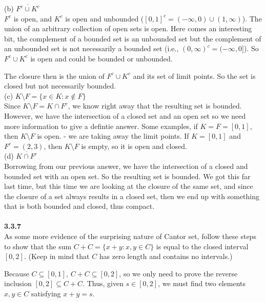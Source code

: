 (b) $\overline{F^c \cup K^c}$
\\

$F^c$ is open, and $K^c$ is open and unbounded ($[0,1]^c = (-\infty,0) \cup (1, \infty)$).
The union of an arbitrary collection of open sets is open.
Here comes an interesting bit, the complement of a bounded set is an unbounded set but the complement of an
unbounded set is not necessarily a bounded set (i.e., $(0,\infty)^c = (-\infty,0]$).
So $F^c \cup K^c$ is open and could be bounded or unbounded.

The closure then is the union of $F^c \cup K^c$ and its set of limit points.
So the set is closed but not necessarily bounded.
\\

(c) $K\setminus F = \{ x \in K : x\not\in F \}$
\\

Since $K \setminus F = K \cap F^c$, we know right away that the resulting set is bounded.
However, we have the intersection of a closed set and an open set so we need more information to give a defintie answer.
Some examples, if $K = F = [0,1]$, then $K \setminus F$ is open. - we are taking away the limit points.
If $K = [0,1]$ and $F^c = (2,3)$, then $K \setminus F$ is empty, so it is open and closed.
\\

(d) $\overline{K \cap F^c}$
\\

Borrowing from our previous answer, we have the intersection of a closed and bounded set with an open set.
So the resulting set is bounded.
We got this far last time, but this time we are looking at the closure of the same set, and since the closure of
a set always results in a closed set, then we end up with something that is both bounded and closed, thus
compact.
\\~\\



\textbf{3.3.7}
\\

As some more evidence of the surprising nature of Cantor set, follow these steps to show that the sum
$C + C = \{ x+y : x,y\in C \}$
is equal to the closed interval $[0,2]$.
(Keep in mind that $C$ has zero length and contains no intervals.)

Because $C \subseteq [0,1]$, $C + C \subseteq [0,2]$, so we only need to prove the reverse inclusion
$[0,2] \subseteq C + C$.
Thus, given $s \in  [0,2]$, we must find two elements $x,y \in C$ satisfying $x + y = s$.
\\

